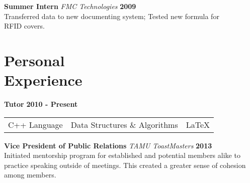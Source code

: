 {\begin{resume}


{\bf Summer Intern} {\em FMC Technologies} \hfill {\bf 2009} \
\\
Transferred data to new documenting system; Tested new formula for \\ RFID covers.

\vspace*{.20in}
{\color{Black}
  \section{\sc Personal \\ Experience}}
{\bf Tutor} \hfill {\bf 2010 - Present} \
\\
\begin{tabular}{l l l}
  C++ Language & Data Structures \& Algorithms & \LaTeX{}
\end{tabular}

\vspace{-.13in}
{\bf Vice President of Public Relations} {\em TAMU ToastMasters} \hfill {\bf 2013} \
\\
Initiated mentorship program for established and potential members alike to practice speaking outside of meetings. This created a greater sense of cohesion among members.




\end{resume}}
